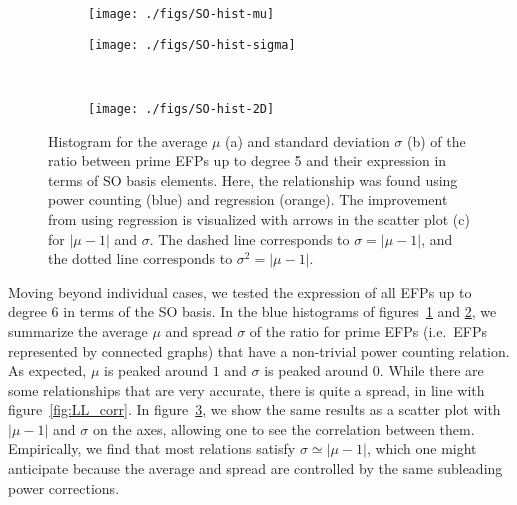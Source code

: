 \documentclass[a4paper,11pt]{article}
\newcommand{\fig}[1]{figure~\ref{fig:#1}}
\newcommand{\figs}[2]{figures~\ref{fig:#1} and \ref{fig:#2}}
\begin{document}
   \begin{figure}[p]
   \centering
    \begin{subfigure}{0.48\textwidth}
     \texttt{[image: ./figs/SO-hist-mu]}
     \caption{}
     \label{fig:SO_hist_a}
     \end{subfigure}     
     \hfill
    \begin{subfigure}{0.48\textwidth}     
     \texttt{[image: ./figs/SO-hist-sigma]} 
     \caption{}
     \label{fig:SO_hist_b}
     \end{subfigure} 
     \\
     \vspace{0.5cm}
     \begin{subfigure}{0.6\textwidth}
      \hspace{-0.45cm}\texttt{[image: ./figs/SO-hist-2D]} 
     \caption{}
     \label{fig:SO_hist_c}
     \end{subfigure}
\caption{
%
%
Histogram for the average $\mu$ (a) and standard deviation $\sigma$ (b) of the ratio between prime EFPs up to degree 5 and their expression in terms of SO basis elements.
%
Here, the relationship was found using power counting (blue) and regression (orange).
%
The improvement from using regression is visualized with arrows in the scatter plot (c) for $|\mu-1|$ and $\sigma$.
%
The dashed line corresponds to $\sigma = |\mu-1|$, and the dotted line corresponds to $\sigma^2 = |\mu-1|$.
}
\label{fig:SO_hist}
     \end{figure}


Moving beyond individual cases, we tested the expression of all EFPs up to degree 6 in terms of the SO basis.
%
In the blue histograms of \figs{SO_hist_a}{SO_hist_b}, we summarize the average $\mu$ and spread $\sigma$ of the ratio for prime EFPs (i.e.~EFPs represented by connected graphs) that have a non-trivial power counting relation.
%
As expected, $\mu$ is peaked around $1$ and $\sigma$ is peaked around 0.     
While there are some relationships that are very accurate, there is quite a spread, in line with \fig{LL_corr}.
%
In \fig{SO_hist_c}, we show the same results as a scatter plot with $|\mu-1|$ and $\sigma$ on the axes, allowing one to see the correlation between them.
%
Empirically, we find that most relations satisfy $\sigma \simeq |\mu-1|$, which one might anticipate because the average and spread are controlled by the same subleading power corrections.
\end{document}

